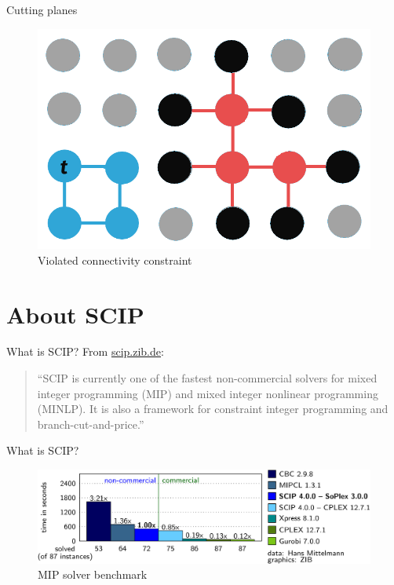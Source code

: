 \documentclass[fleqn]{beamer}
\begin{document}
	\begin{frame}{Cutting planes}
		\begin{figure}
			\centering
			\includegraphics[scale=.3]{cuttingplanes.png}
			\caption{Violated connectivity constraint}
		\end{figure}
	\end{frame}
	
	\section{About SCIP}
	\begin{frame}{What is SCIP?}
		From \url{scip.zib.de}:
		\begin{quote}
			``SCIP is currently one of the fastest non-commercial solvers for mixed integer programming (MIP)
			and mixed integer nonlinear programming (MINLP).
			It is also a framework for constraint integer programming and branch-cut-and-price.''
		\end{quote}
	\end{frame}

    \begin{frame}{What is SCIP?}
        \begin{figure}
            \includegraphics{comparison}
            \caption{MIP solver benchmark}
        \end{figure}
    \end{frame}
\end{document}

